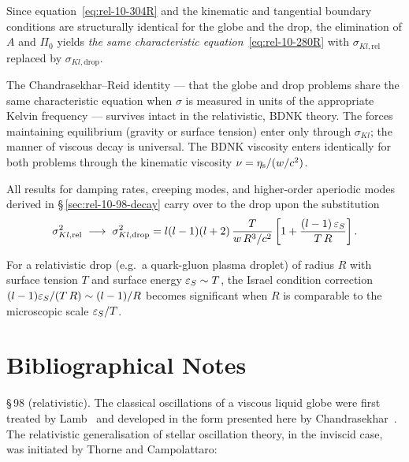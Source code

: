 Since equation~\eqref{eq:rel-10-304R} and the kinematic and
tangential boundary conditions are structurally identical for the
globe and the drop, the elimination of $A$ and $\Pi_{0}$ yields
\emph{the same characteristic equation}~\eqref{eq:rel-10-280R}
with $\sigma_{Kl,\mathrm{rel}}$ replaced by
$\sigma_{Kl,\mathrm{drop}}$.

\begin{relcorrection}
The Chandrasekhar--Reid identity --- that the globe and drop problems
share the same characteristic equation when $\sigma$ is measured in
units of the appropriate Kelvin frequency --- survives intact in
the relativistic, BDNK theory.  The forces maintaining
equilibrium (gravity or surface tension) enter only through
$\sigma_{Kl}$; the manner of viscous decay is universal.  The
BDNK viscosity enters identically for both problems through the
kinematic viscosity $\nu = \eta_{\mathrm{s}}/(w/c^2)$.
\end{relcorrection}

All results for damping rates, creeping modes, and higher-order
aperiodic modes derived in
\S\,\ref{sec:rel-10-98-decay} carry over to the drop upon the
substitution
\begin{equation}\label{eq:rel-10-drop-sub}
  \sigma_{Kl,\mathrm{rel}}^{2}
  \;\longrightarrow\;
  \sigma_{Kl,\mathrm{drop}}^{2}
  = l(l-1)(l+2)\,\frac{T}{w\,R^{3}/c^{2}}
    \left[1 + \frac{(l-1)\,\varepsilon_{S}}{T\,R}\right].
\end{equation}

For a relativistic drop (e.g.\ a quark-gluon plasma droplet) of
radius $R$ with surface tension $T$ and surface energy
$\varepsilon_{S} \sim T$, the Israel condition correction
$(l-1)\varepsilon_{S}/(T\,R) \sim (l-1)/R$ becomes significant
when $R$ is comparable to the microscopic scale $\varepsilon_{S}/T$.


\section*{Bibliographical Notes}

\noindent\S\,98 (relativistic).
The classical oscillations of a viscous liquid globe were first
treated by Lamb~\cite{Lamb1881} and developed in the form presented
here by Chandrasekhar~\cite{Chandrasekhar1959globe}.  The relativistic
generalisation of stellar oscillation theory, in the inviscid case,
was initiated by Thorne and Campolattaro:

